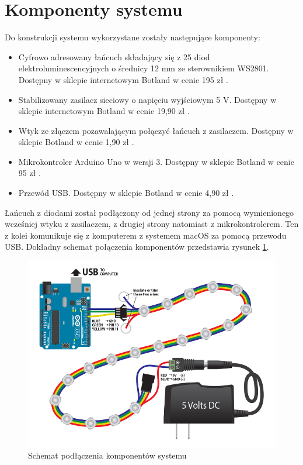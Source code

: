\documentclass[12pt]{report}
\begin{document}
\section{Komponenty systemu} \label{komp}

Do konstrukcji systemu wykorzystane zostały następujące komponenty:

\begin{itemize}
	\item Cyfrowo adresowany łańcuch składający się z 25 diod elektroluminescencyjnych o średnicy 12 mm ze sterownikiem WS2801. Dostępny w sklepie internetowym Botland w cenie 195 zł \cite{diody}.
	\item Stabilizowany zasilacz sieciowy o napięciu wyjściowym 5 V. Dostępny w sklepie internetowym Botland w cenie 19,90 zł \cite{zasilacz}.
	\item Wtyk ze złączem pozawalającym połączyć łańcuch z zasilaczem. Dostępny w sklepie Botland w cenie 1,90 zł \cite{wtyk}.
	\item Mikrokontroler Arduino Uno w wersji 3. Dostępny w sklepie Botland w cenie 95 zł \cite{arduino}.
	\item Przewód USB. Dostępny w sklepie Botland w cenie 4,90 zł \cite{usb}.
\end{itemize}

Łańcuch z diodami został podłączony od jednej strony za pomocą wymienionego wcześniej wtyku z zasilaczem, z drugiej strony natomiast z mikrokontrolerem. Ten z kolei komunikuje się z komputerem z systemem macOS za pomocą przewodu USB. Dokładny schemat połączenia komponentów przedstawia rysunek \ref{schemat}.
	
\begin{figure}[h]
\centering
\includegraphics[width=\textwidth]{../resources/wiring.png}
\caption[Schemat podłączenia komponentów systemu]{Schemat podłączenia komponentów systemu \cite{schemat}}
\label{schemat}
\end{figure}
		
\end{document}
